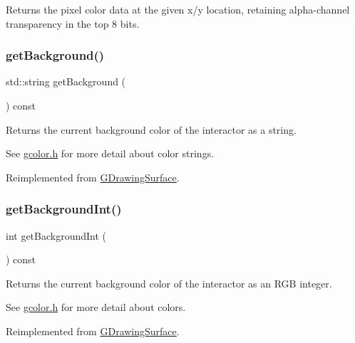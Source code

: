 Returns the pixel color data at the given x/y location, retaining alpha-\/channel transparency in the top 8 bits. 

\mbox{\label{classGCanvas_ab44f928b6bd7c8e4b82d5ed92bc3d4c6}} 
\subsubsection{\texorpdfstring{get\+Background()}{getBackground()}}
{\footnotesize\ttfamily std\+::string get\+Background (\begin{DoxyParamCaption}{ }\end{DoxyParamCaption}) const\hspace{0.3cm}{\ttfamily [virtual]}}



Returns the current background color of the interactor as a string. 

See \mbox{\hyperlink{gcolor_8h_source}{gcolor.\+h}} for more detail about color strings. 

Reimplemented from \mbox{\hyperlink{classGDrawingSurface_a808e22cc1fdfbecf71ed8c64ef4600e0}{G\+Drawing\+Surface}}.

\mbox{\label{classGCanvas_af66f525e8154dbc8dcd2daecf3728ba9}} 
\subsubsection{\texorpdfstring{get\+Background\+Int()}{getBackgroundInt()}}
{\footnotesize\ttfamily int get\+Background\+Int (\begin{DoxyParamCaption}{ }\end{DoxyParamCaption}) const\hspace{0.3cm}{\ttfamily [virtual]}}



Returns the current background color of the interactor as an R\+GB integer. 

See \mbox{\hyperlink{gcolor_8h_source}{gcolor.\+h}} for more detail about colors. 

Reimplemented from \mbox{\hyperlink{classGDrawingSurface_a9e827257a55cb8cf4d9de2ec6bcfd7a0}{G\+Drawing\+Surface}}.

